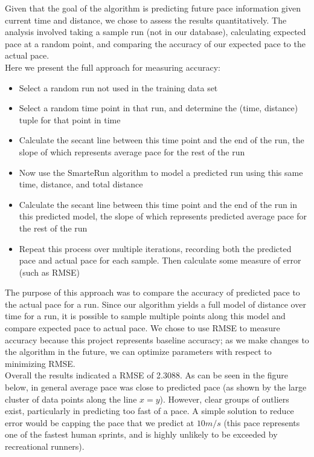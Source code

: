 \documentclass[twoside]{article}
\begin{document}
\begin{multicols}{2}
\indent Given that the goal of the algorithm is predicting future pace information given current time and distance, we chose to assess the results quantitatively. The analysis involved taking a sample run (not in our database), calculating expected pace at a random point, and comparing the accuracy of our expected pace to the actual pace.\\

Here we present the full approach for measuring accuracy:
\begin{itemize}
\item Select a random run not used in the training data set
\item Select a random time point in that run, and determine the (time, distance) tuple for that point in time
\item Calculate the secant line between this time point and the end of the run, the slope of which represents average pace for the rest of the run
\item Now use the SmarteRun algorithm to model a predicted run using this same time, distance, and total distance
\item Calculate the secant line between this time point and the end of the run in this predicted model, the slope of which represents predicted average pace for the rest of the run
        	
\item Repeat this process over multiple iterations, recording both the predicted pace and actual pace for each sample. Then calculate some measure of error (such as RMSE)
\end{itemize}

The purpose of this approach was to compare the accuracy of predicted pace to the actual pace for a run. Since our algorithm yields a full model of distance over time for a run, it is possible to sample multiple points along this model and compare expected pace to actual pace. We chose to use RMSE to measure accuracy because this project represents baseline accuracy; as we make changes to the algorithm in the future, we can optimize parameters with respect to minimizing RMSE.\\

Overall the results indicated a RMSE of 2.3088. As can be seen in the figure below, in general average pace was close to predicted pace (as shown by the large cluster of data points along the line $x=y$). However, clear groups of outliers exist, particularly in predicting too fast of a pace. A simple solution to reduce error would be capping the pace that we predict at $10 m/s$ (this pace represents one of the fastest human sprints, and is highly unlikely to be exceeded by recreational runners).


\end{multicols}
\end{document}
